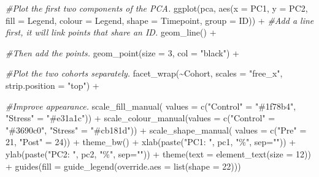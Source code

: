 \documentclass[
]{article}
\newenvironment{Shaded}{\begin{snugshade}}{\end{snugshade}}
\newcommand{\AttributeTok}[1]{\textcolor[rgb]{0.77,0.63,0.00}{#1}}
\newcommand{\CommentTok}[1]{\textcolor[rgb]{0.56,0.35,0.01}{\textit{#1}}}
\newcommand{\DecValTok}[1]{\textcolor[rgb]{0.00,0.00,0.81}{#1}}
\newcommand{\FunctionTok}[1]{\textcolor[rgb]{0.00,0.00,0.00}{#1}}
\newcommand{\NormalTok}[1]{#1}
\newcommand{\OtherTok}[1]{\textcolor[rgb]{0.56,0.35,0.01}{#1}}
\newcommand{\SpecialCharTok}[1]{\textcolor[rgb]{0.00,0.00,0.00}{#1}}
\newcommand{\StringTok}[1]{\textcolor[rgb]{0.31,0.60,0.02}{#1}}
\begin{document}
\begin{Shaded}
\begin{Highlighting}[]
\CommentTok{\#Plot the first two components of the PCA.}
\FunctionTok{ggplot}\NormalTok{(pca, }\FunctionTok{aes}\NormalTok{(}\AttributeTok{x       =}\NormalTok{ PC1, }
                \AttributeTok{y       =}\NormalTok{ PC2, }
                \AttributeTok{fill    =}\NormalTok{ Legend,}
                \AttributeTok{colour  =}\NormalTok{ Legend,}
                \AttributeTok{shape   =}\NormalTok{ Timepoint, }
                \AttributeTok{group   =}\NormalTok{ ID)) }\SpecialCharTok{+}  
  \CommentTok{\#Add a line first, it will link points that share an ID. }
  \FunctionTok{geom\_line}\NormalTok{() }\SpecialCharTok{+}
  
  \CommentTok{\#Then add the points.}
  \FunctionTok{geom\_point}\NormalTok{(}\AttributeTok{size =} \DecValTok{3}\NormalTok{, }\AttributeTok{col =} \StringTok{"black"}\NormalTok{) }\SpecialCharTok{+} 
  
  \CommentTok{\#Plot the two cohorts separately. }
  \FunctionTok{facet\_wrap}\NormalTok{(}\SpecialCharTok{\textasciitilde{}}\NormalTok{Cohort, }\AttributeTok{scales =} \StringTok{"free\_x"}\NormalTok{, }\AttributeTok{strip.position =} \StringTok{"top"}\NormalTok{) }\SpecialCharTok{+}
  
  \CommentTok{\#Improve appearance.}
  \FunctionTok{scale\_fill\_manual}\NormalTok{(  }\AttributeTok{values =} \FunctionTok{c}\NormalTok{(}\StringTok{"Control"}  \OtherTok{=} \StringTok{"\#1f78b4"}\NormalTok{, }
                                 \StringTok{"Stress"}   \OtherTok{=} \StringTok{"\#e31a1c"}\NormalTok{)) }\SpecialCharTok{+} 
  \FunctionTok{scale\_colour\_manual}\NormalTok{(}\AttributeTok{values =} \FunctionTok{c}\NormalTok{(}\StringTok{"Control"}  \OtherTok{=} \StringTok{"\#3690c0"}\NormalTok{, }
                                 \StringTok{"Stress"}   \OtherTok{=} \StringTok{"\#cb181d"}\NormalTok{)) }\SpecialCharTok{+} 
  \FunctionTok{scale\_shape\_manual}\NormalTok{( }\AttributeTok{values =} \FunctionTok{c}\NormalTok{(}\StringTok{"Pre"}  \OtherTok{=} \DecValTok{21}\NormalTok{, }
                                \StringTok{"Post"} \OtherTok{=} \DecValTok{24}\NormalTok{)) }\SpecialCharTok{+}  
  \FunctionTok{theme\_bw}\NormalTok{() }\SpecialCharTok{+}
  \FunctionTok{xlab}\NormalTok{(}\FunctionTok{paste}\NormalTok{(}\StringTok{"PC1: "}\NormalTok{, pc1,  }\StringTok{"\%"}\NormalTok{, }\AttributeTok{sep=}\StringTok{""}\NormalTok{)) }\SpecialCharTok{+} 
  \FunctionTok{ylab}\NormalTok{(}\FunctionTok{paste}\NormalTok{(}\StringTok{"PC2: "}\NormalTok{, pc2,  }\StringTok{"\%"}\NormalTok{, }\AttributeTok{sep=}\StringTok{""}\NormalTok{)) }\SpecialCharTok{+} 
  \FunctionTok{theme}\NormalTok{(}\AttributeTok{text =} \FunctionTok{element\_text}\NormalTok{(}\AttributeTok{size =} \DecValTok{12}\NormalTok{)) }\SpecialCharTok{+}
  \FunctionTok{guides}\NormalTok{(}\AttributeTok{fill =} \FunctionTok{guide\_legend}\NormalTok{(}\AttributeTok{override.aes =} \FunctionTok{list}\NormalTok{(}\AttributeTok{shape =} \DecValTok{22}\NormalTok{)))}
\end{Highlighting}
\end{Shaded}
\end{document}
